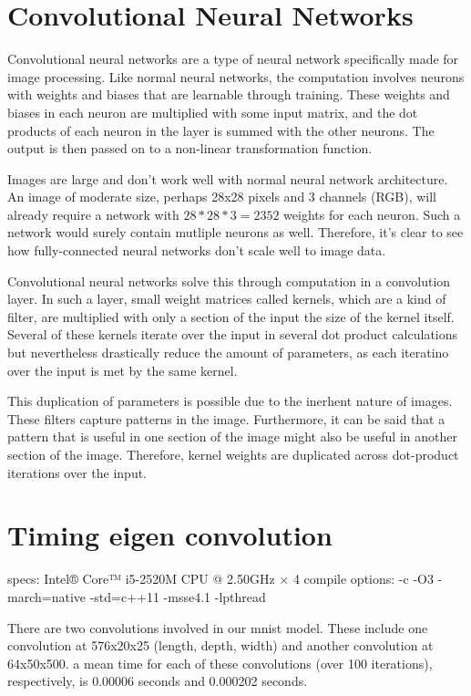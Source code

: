 \documentclass[12pt]{article}
\begin{document}
\section{Convolutional Neural Networks}
Convolutional neural networks are a type of neural network specifically made for image processing. Like normal neural networks, the computation involves neurons with weights and biases that are learnable through training. These weights and biases in each neuron are multiplied with some input matrix, and the dot products of each neuron in the layer is summed with the other neurons. The output is then passed on to a non-linear transformation function.

Images are large and don't work well with normal neural network architecture. An image of moderate size, perhaps 28x28 pixels and 3 channels (RGB), will already require a network with \begin{math}28*28*3 = 2352\end{math} weights for each neuron. Such a network would surely contain mutliple neurons as well. Therefore, it's clear to see how fully-connected neural networks don't scale well to image data. 

Convolutional neural networks solve this through computation in a convolution layer. In such a layer, small weight matrices called kernels, which are a kind of filter, are multiplied with only a section of the input the size of the kernel itself. Several of these kernels iterate over the input in several dot product calculations but nevertheless drastically reduce the amount of parameters, as each iteratino over the input is met by the same kernel.

This duplication of parameters is possible due to the inerhent nature of images. These filters capture patterns in the image. Furthermore, it can be said that a pattern that is useful in one section of the image might also be useful in another section of the image. Therefore, kernel weights are duplicated across dot-product iterations over the input.

\section{Timing eigen convolution}
specs: Intel® Core™ i5-2520M CPU @ 2.50GHz × 4
compile options: -c -O3 -march=native -std=c++11 -msse4.1 -lpthread

There are two convolutions involved in our mnist model. These include one convolution at 576x20x25 (length, depth, width) and another convolution at 64x50x500. a mean time for each of these convolutions (over 100 iterations), respectively, is 0.00006 seconds and 0.000202 seconds.
\end{document}
